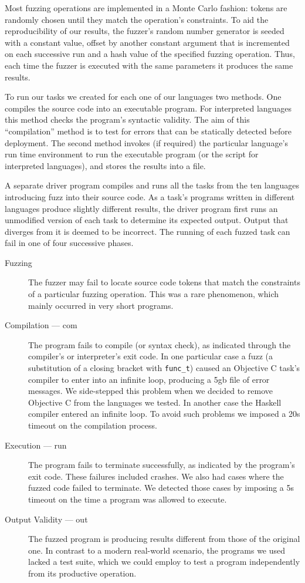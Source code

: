 \documentclass[10pt]{sigplanconf}
\begin{document}
Most fuzzing operations are implemented in a Monte Carlo fashion:
tokens are randomly chosen until they match the operation's constraints.
To aid the reproducibility of our results,
the fuzzer's random number generator is seeded with a constant value,
offset by another constant argument that is incremented on each successive run
and a hash value of the specified fuzzing operation.
Thus, each time the fuzzer is executed with the same parameters it
produces the same results.

To run our tasks we created for each one of our languages two methods.
One compiles the source code into an executable program.
For interpreted languages this method checks the program's syntactic validity.
The aim of this ``compilation'' method is to test for errors that can
be statically detected before deployment.
The second method invokes (if required) the particular language's
run time environment to run the executable program
(or the script for interpreted languages),
and stores the results into a file.

A separate driver program compiles and runs all the tasks from the ten
languages introducing fuzz into their source code.
As a task's programs written in different languages produce slightly
different results,
the driver program first runs an unmodified version of each task
to determine its expected output.
Output that diverges from it is deemed to be incorrect.
The running of each fuzzed task can fail in one of four successive
phases.
\begin{description}
\item[Fuzzing]
The fuzzer may fail to locate source code tokens that match the
constraints of a particular fuzzing operation.
This was a rare phenomenon, which mainly occurred in very short programs.
\item[Compilation --- com]
The program fails to compile (or syntax check),
as indicated through the compiler's or interpreter's exit code.
In one particular case a fuzz
(a substitution of a closing bracket with {\tt func\_t})
caused an Objective C task's compiler
to enter into an infinite loop,
producing a 5{\sc gb} file of error messages.
We side-stepped this problem when we decided to remove Objective C from
the languages we tested.
In another case the Haskell compiler entered an infinite loop.
To avoid such problems we imposed a 20s timeout on the compilation process.
\item[Execution --- run]
The program fails to terminate successfully,
as indicated by the program's exit code.
These failures included crashes.
We also had cases where the fuzzed code failed to terminate.
We detected those cases by imposing a 5s timeout on the time a program
was allowed to execute.
\item[Output Validity --- out]
The fuzzed program is producing results different from those of
the original one.
In contrast to a modern real-world scenario,
the programs we used lacked a test suite,
which we could employ to test a program independently from its productive
operation.
\end{description}
\end{document}
